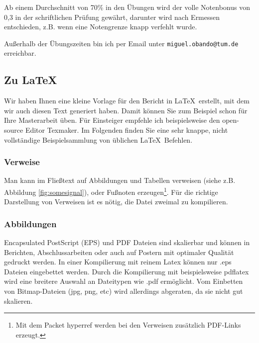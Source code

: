 Ab einem Durchschnitt von 70\% in den Übungen wird der volle Notenbonus von 0,3 in der schriftlichen Prüfung gewährt, darunter wird nach Ermessen entschieden, z.B. wenn eine Notengrenze knapp verfehlt wurde.

Außerhalb der Übungszeiten bin ich per Email unter \texttt{miguel.obando@tum.de} erreichbar.

\subsection{Zu \LaTeX}
Wir haben Ihnen eine kleine Vorlage für den Bericht in \LaTeX\ erstellt, mit dem wir auch diesen Text generiert haben. Damit können Sie zum Beispiel schon für Ihre Masterarbeit üben. Für Einsteiger empfehle ich beispielsweise den open-source Editor Texmaker.
Im Folgenden finden Sie eine sehr knappe, nicht vollständige Beispielsammlung von üblichen \LaTeX\ Befehlen.

\subsubsection{Verweise}
Man kann im Fließtext auf Abbildungen und Tabellen verweisen (siehe z.B. Abbildung \ref{fig:somesignal}), oder Fußnoten erzeugen\footnote{Mit dem Packet hyperref werden bei den Verweisen zusätzlich PDF-Links erzeugt.}. Für die richtige Darstellung von Verweisen ist es nötig, die Datei zweimal zu kompilieren.

\subsubsection{Abbildungen}
Encapsulated PostScript (EPS) und PDF Dateien sind skalierbar und können in Berichten, Abschlussarbeiten oder auch auf Postern mit optimaler Qualität gedruckt werden. In einer Kompilierung mit reinem Latex können nur .eps Dateien eingebettet werden. Durch die Kompilierung mit beispielsweise pdflatex wird eine breitere Auswahl an Dateitypen wie .pdf ermöglicht. Vom Einbetten von Bitmap-Dateien (jpg, png, etc) wird allerdings abgeraten, da sie nicht gut skalieren.

